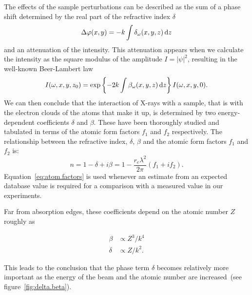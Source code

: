 The effects of the sample perturbations can be described as the sum of
a phase shift determined by the real part of the refractive index $\delta$
\begin{equation}
    \Delta\varphi(x, y) = -k \int \delta_\omega(x, y, z) \operatorname{d}\!{z}
    \label{eq:phase.deviation}
\end{equation}
and an attenuation of the intensity. This attenuation appears when we
calculate the intensity as the square modulus of the
amplitude $I = |\psi|^2$, resulting in the well-known Beer-Lambert law
\begin{equation}
    I(\omega, x, y, z_0) = \exp\left\{-2k\int \beta_\omega(x, y, z) \operatorname{d}\!{z}\right\}
    I(\omega, x, y, 0).\label{eq:beer-lambert}
\end{equation}
We can then conclude that the interaction of X-rays with a sample, that is
with the electron clouds of the atoms that make it up, is determined by
two energy-dependent coefficients $\delta$ and $\beta$. These have been
thoroughly studied and tabulated in terms of the atomic form
factors $f_1$ and $f_2$ respectively. The relationship between the
refractive index, $\delta$, $\beta$ and the atomic form factors $f_1$ and
$f_2$ is:
\begin{equation}
    n = 1 - \delta + i\beta = 1 - \frac{r_e\lambda^2}{2\pi}(f_1 + if_2).
    \label{eq:atom.factors}
\end{equation}
Equation~\eqref{eq:atom.factors} is used whenever an estimate from an
expected database value is required for a comparison with a measured
value in our experiments.

Far from absorption edges, these coefficients depend on the atomic number
$Z$ roughly as~\cite{knoll2000radiation,Momose2005}

\begin{align}
    \beta &\propto Z^3 / k^4\\
    \delta &\propto Z / k^2.
    \label{eq:delta.beta.energy}
\end{align}

This leads to the conclusion that the phase term $\delta$ becomes
relatively more important as the energy of the beam and the atomic number
are increased~(see figure~\ref{fig:delta.beta}).

